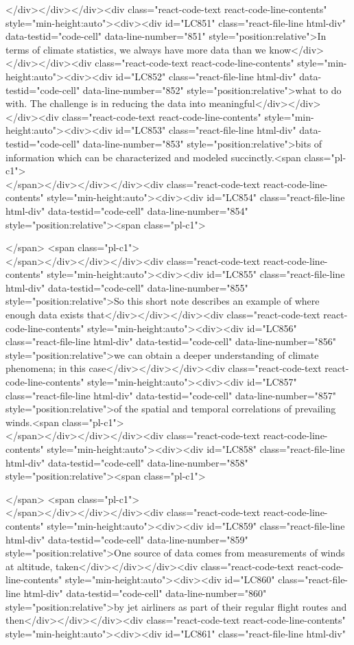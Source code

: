 {{{{{{</div></div></div><div class="react-code-text react-code-line-contents" style="min-height:auto"><div><div id="LC851" class="react-file-line html-div" data-testid="code-cell" data-line-number="851" style="position:relative">In terms of climate statistics, we always have more data than we know</div></div></div><div class="react-code-text react-code-line-contents" style="min-height:auto"><div><div id="LC852" class="react-file-line html-div" data-testid="code-cell" data-line-number="852" style="position:relative">what to do with. The challenge is in reducing the data into meaningful</div></div></div><div class="react-code-text react-code-line-contents" style="min-height:auto"><div><div id="LC853" class="react-file-line html-div" data-testid="code-cell" data-line-number="853" style="position:relative">bits of information which can be characterized and modeled succinctly.<span class="pl-c1">\\</span></div></div></div><div class="react-code-text react-code-line-contents" style="min-height:auto"><div><div id="LC854" class="react-file-line html-div" data-testid="code-cell" data-line-number="854" style="position:relative"><span class="pl-c1">\strut</span> <span class="pl-c1">\\</span></div></div></div><div class="react-code-text react-code-line-contents" style="min-height:auto"><div><div id="LC855" class="react-file-line html-div" data-testid="code-cell" data-line-number="855" style="position:relative">So this short note describes an example of where enough data exists that</div></div></div><div class="react-code-text react-code-line-contents" style="min-height:auto"><div><div id="LC856" class="react-file-line html-div" data-testid="code-cell" data-line-number="856" style="position:relative">we can obtain a deeper understanding of climate phenomena; in this case</div></div></div><div class="react-code-text react-code-line-contents" style="min-height:auto"><div><div id="LC857" class="react-file-line html-div" data-testid="code-cell" data-line-number="857" style="position:relative">of the spatial and temporal correlations of prevailing winds.<span class="pl-c1">\\</span></div></div></div><div class="react-code-text react-code-line-contents" style="min-height:auto"><div><div id="LC858" class="react-file-line html-div" data-testid="code-cell" data-line-number="858" style="position:relative"><span class="pl-c1">\strut</span> <span class="pl-c1">\\</span></div></div></div><div class="react-code-text react-code-line-contents" style="min-height:auto"><div><div id="LC859" class="react-file-line html-div" data-testid="code-cell" data-line-number="859" style="position:relative">One source of data comes from measurements of winds at altitude, taken</div></div></div><div class="react-code-text react-code-line-contents" style="min-height:auto"><div><div id="LC860" class="react-file-line html-div" data-testid="code-cell" data-line-number="860" style="position:relative">by jet airliners as part of their regular flight routes and then</div></div></div><div class="react-code-text react-code-line-contents" style="min-height:auto"><div><div id="LC861" class="react-file-line html-div" }}}}}}
